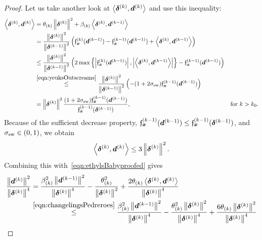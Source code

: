 \documentclass{article}
\theoremstyle{plain}
\theoremstyle{definition}
\begin{document}
\begin{proof}
		Let us take another look at $\left\langle \bm{\delta}^{(k)}, \bm{d}^{(k)} \right\rangle$ and use this inequality:
	\begin{align*}
		\left\langle \bm{\delta}^{(k)}, \bm{d}^{(k)} \right\rangle
		&= 
		\theta_{(k)}
		\left\|\bm{\delta}^{(k)}\right\|^2
		+ 
		\beta_{(k)} \left\langle \bm{\delta}^{(k)}, \bm{d}^{(k-1)} \right\rangle
		\\
		&=
		\frac{\left\|\bm{\delta}^{(k)}\right\|^2}{\left\|\bm{\delta}^{(k-1)}\right\|^2}
		\left(
			\mathfrak{f}_{\bm{x}}^{(k)}(\bm{d}^{(k-1)}) - \mathfrak{f}_{\bm{x}}^{(k-1)}(\bm{d}^{(k-1)}) + \left\langle \bm{\delta}^{(k)}, \bm{d}^{(k-1)} \right\rangle
		\right)
		\\
		&\leq
		\frac{\left\|\bm{\delta}^{(k)}\right\|^2}{\left\|\bm{\delta}^{(k-1)}\right\|^2}
		\left(
			2\max\left\{
				\left|\mathfrak{f}_{\bm{x}}^{(k)}(\bm{d}^{(k-1)})\right|,
				\left|\left\langle \bm{\delta}^{(k)}, \bm{d}^{(k-1)} \right\rangle\right|
			\right\}
			- \mathfrak{f}_{\bm{x}}^{(k-1)}(\bm{d}^{(k-1)})
		\right)
		\\
		&\stackrel{\eqref{eqn:yeuksOutscreams}}\leq
		\frac{\left\|\bm{\delta}^{(k)}\right\|^2}{\left\|\bm{\delta}^{(k-1)}\right\|^2}
		\left(
			-(1+2\sigma_{\text{sw}})\mathfrak{f}_{\bm{x}}^{(k-1)}(\bm{d}^{(k-1)})
		\right)
		\\
		&=
		\left\|\bm{\delta}^{(k)}\right\|^2 
		\frac{
			(1+2\sigma_{\text{sw}})\mathfrak{f}_{\bm{x}}^{(k-1)}(\bm{d}^{(k-1)})
			}{
			\mathfrak{f}_{\bm{x}}^{(k-1)}(\bm{\delta}^{(k-1)})
		},
		&\text{for $k > k_0$.}
	\end{align*}
	Because of the sufficient decrease property, $\mathfrak{f}_{\bm{x}}^{(k-1)}(\bm{d}^{(k-1)}) \leq \mathfrak{f}_{\bm{x}}^{(k-1)}(\bm{\delta}^{(k-1)})$, and
	$\sigma_{\text{sw}} \in (0,1)$, we obtain
	\begin{equation}	
		\left\langle \bm{\delta}^{(k)}, \bm{d}^{(k)} \right\rangle \leq 3 \left\|\bm{\delta}^{(k)}\right\|^2.
	\label{eqn:changelingsPedreroes}
	\end{equation}
	Combining this with~\eqref{eqn:ethylsBabyproofed} gives
	\begin{align}
		\frac{
			\norm{\vdK}^2
		}{
			\norm{\sdK}^4
		}
		&=
		\frac{
			\beta\kK^2\norm{\vdKp}^2
		}{
			\norm{\sdK}^4
		}
		-
		\frac{
			\theta\kK^2
		}{
			\norm{\sdK}^2
		}
		+ 
		\frac{
			2\theta\kK\mul{\sdK}{\vdK}
		}{
			\norm{\sdK}^4
		}
		\nonumber
		\\
		&\stackrel{\eqref{eqn:changelingsPedreroes}}\leq
		\frac{
			\beta\kK^2\norm{\vdKp}^2
		}{
			\norm{\sdK}^4
		}
		-
		\frac{
			\theta\kK^2 \norm{\sdK}^2
		}{
			\norm{\sdK}^4
		}
		+
		\frac{
		6\theta\kK \norm{\sdK}^2
		}
		{\norm{\sdK}^4
		}
		\nonumber
		\\

\end{align}
\end{proof}
\end{document}
